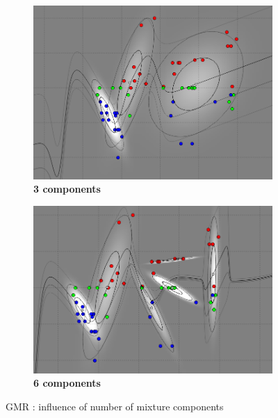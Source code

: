 \begin{figure}[!ht]
\centering
\begin{subfigure}[h]{0.45\textwidth}
\centering
\includegraphics[height=0.11\textheight]{./regression/full_cov_kmeans_3_mixture_100train.png}
\caption{\bf 3 components}
\end{subfigure}
\begin{subfigure}[h]{0.45\textwidth}
\centering
\includegraphics[height=0.11\textheight]{./regression/full_cov_kmeans_6_mixture_100train.png}
\caption{\bf 6 components}
\end{subfigure}

\caption{GMR : influence of number of mixture components}
\label{fig:number_mixture_components}
\end{figure}


